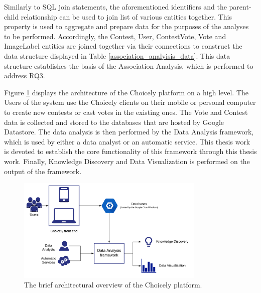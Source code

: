     Similarly to SQL join statements, the aforementioned identifiers and the parent-child relationship can be used to join list of various entities together. This property is used to aggregate and prepare data for the purposes of the analyses to be performed. Accordingly, the Contest, User, ContestVote, Vote and ImageLabel entities are joined together via their connections to construct the data structure displayed in Table \ref{association_analyisis_data}. This data structure establishes the basis of the Association Analysis, which is performed to address RQ3. 

    Figure \ref{choicely_architecture} displays the architecture of the Choicely platform on a high level. The Users of the system use the Choicely clients on their mobile or personal computer to create new contests or cast votes in the existing ones. 
    The Vote and Contest data is collected and stored to the databases that are hosted by Google Datastore. The data analysis is then performed by the Data Analysis framework, which is used by either a data analyst or an automatic service. This thesis work is devoted to establish the core functionality of this framework through this thesis work. Finally, Knowledge Discovery and Data Visualization is performed on the output of the framework. 

    \begin{figure}[h] 
		\begin{center}
            \includegraphics[width=0.8\textwidth]{Images/architecture.png}
			\caption{The brief architectural overview of the Choicely platform.}
			\label{choicely_architecture}
		\end{center}
    \end{figure}

